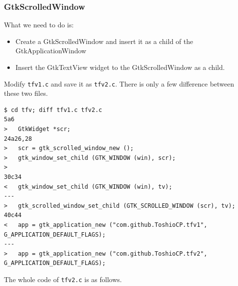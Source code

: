 \subsubsection{GtkScrolledWindow}\label{gtkscrolledwindow}

What we need to do is:

\begin{itemize}
\tightlist
\item
  Create a GtkScrolledWindow and insert it as a child of the
  GtkApplicationWindow
\item
  Insert the GtkTextView widget to the GtkScrolledWindow as a child.
\end{itemize}

Modify \passthrough{\lstinline!tfv1.c!} and save it as
\passthrough{\lstinline!tfv2.c!}. There is only a few difference between
these two files.

\begin{lstlisting}
$ cd tfv; diff tfv1.c tfv2.c
5a6
>   GtkWidget *scr;
24a26,28
>   scr = gtk_scrolled_window_new ();
>   gtk_window_set_child (GTK_WINDOW (win), scr);
> 
30c34
<   gtk_window_set_child (GTK_WINDOW (win), tv);
---
>   gtk_scrolled_window_set_child (GTK_SCROLLED_WINDOW (scr), tv);
40c44
<   app = gtk_application_new ("com.github.ToshioCP.tfv1", G_APPLICATION_DEFAULT_FLAGS);
---
>   app = gtk_application_new ("com.github.ToshioCP.tfv2", G_APPLICATION_DEFAULT_FLAGS);
\end{lstlisting}

The whole code of \passthrough{\lstinline!tfv2.c!} is as follows.

